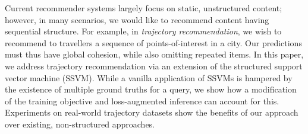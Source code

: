 
Current recommender systems largely focus on static, unstructured content;
however, in many scenarios, we would like to recommend content having sequential structure.
For example, in \emph{trajectory recommendation}, we wish to recommend to travellers a sequence of points-of-interest in a city.
Our predictions must thus have global cohesion, while also omitting repeated items.
In this paper, we address trajectory recommendation via an extension of the structured support vector machine (SSVM).
While a vanilla application of SSVMs is hampered by the existence of multiple ground truths for a query,
we show how a modification of the training objective and loss-augmented inference can account for this.
Experiments on real-world trajectory datasets show the benefits of our approach over existing, non-structured approaches.




